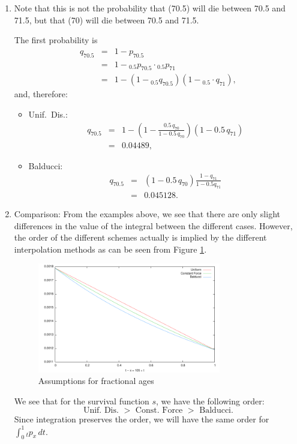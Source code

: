 \documentclass[11pt,fleqn,oneside]{book}
\begin{document}
\begin{enumerate}
\item Note that this is not the probability that (70.5) will die between 70.5 and 71.5, but that (70) will die between 70.5 and 71.5.

The first probability is
\begin{eqnarray*}
{q_{70.5}} &=& 1 - {p_{70.5}}\\
&=& 1 - {_{0.5}p_{70.5}}\cdot{_{0.5}p_{71}} \\
&=& 1 - ( 1 - {_{0.5}q_{70.5}})(1 - {_{0.5}\cdot q_{71}}),
\end{eqnarray*}
and, therefore:
\begin{itemize}
\item Unif.\ Dis.:
\begin{eqnarray*}
{q_{70.5}} &=& 1 - ( 1 - \frac{0.5\,{q_{70}}}{1 - 0.5 \, q_{70}})(1 - {0.5}\,{q_{71}})\\
&=& 0.04489,
\end{eqnarray*}
\item Balducci:
\begin{eqnarray*}
{q_{70.5}} &=& (1 - 0.5\,q_{70}) \frac{1- q_{71}}{1 - 0.5 q_{71}}\\
&=& 0.045128.
\end{eqnarray*}
\end{itemize}
\item Comparison: From the examples above, we see that there are only slight differences in the value of the integral between the different cases. However, the order of the different schemes  actually is implied by the different interpolation methods as can be seen from Figure \ref{FIGFRACAGE}.
\begin{figure}
\begin{center}
\includegraphics[width=8cm]{Graphs/Graph_Interpolatiomethods.pdf}
\end{center}
\caption{Assumptions for fractional ages \label{FIGFRACAGE}}
\end{figure}
We see that for the survival function $s$, we have the following order: 
$$
 \text{Unif.\ Dis. } > \text{ Const.\ Force } > \text{ Balducci}.
$$
Since integration preserves the order, we will have the same order for $\int_0^1 {_tp_x}\,dt$.
\end{enumerate}
\normalsize
\end{document}
